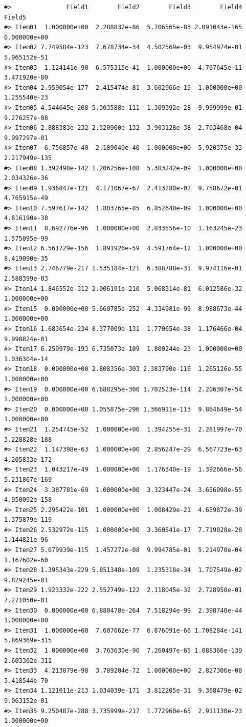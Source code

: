 \begin{verbatim}
#>               Field1        Field2        Field3        Field4        Field5
#> Item01  1.000000e+00  2.288832e-86  5.706565e-83 2.091043e-165  0.000000e+00
#> Item02 7.749584e-123  7.678734e-34  4.502569e-03  9.954974e-01  5.965152e-51
#> Item03  1.124141e-90  6.575315e-41  1.000000e+00  4.767645e-11  3.471920e-80
#> Item04 2.959054e-177  2.415474e-81  3.602966e-19  1.000000e+00  1.255540e-23
#> Item05 4.544645e-208 5.303588e-111  1.309392e-28  9.999999e-01  9.276257e-08
#> Item06 2.888383e-232 2.320900e-132  3.903128e-38  2.703468e-04  9.997297e-01
#> Item07  6.756857e-40  2.189049e-40  1.000000e+00  5.920375e-33 2.217949e-135
#> Item08 1.392498e-142 1.206256e-108  5.383242e-09  1.000000e+00  2.034326e-36
#> Item09 1.936847e-121  4.171067e-67  2.413280e-02  9.758672e-01  4.765915e-49
#> Item10 7.597617e-142  1.803765e-85  6.852640e-09  1.000000e+00  4.816190e-38
#> Item11  8.692776e-96  1.000000e+00  2.833556e-10  1.163245e-23  1.575095e-99
#> Item12 6.561729e-156  1.891926e-59  4.591764e-12  1.000000e+00  8.419090e-35
#> Item13 2.746779e-217 1.535184e-121  6.388788e-31  9.974116e-01  2.588399e-03
#> Item14 1.846552e-312 2.006191e-210  5.068314e-81  6.012586e-32  1.000000e+00
#> Item15  0.000000e+00 5.660785e-252  4.334981e-99  8.988673e-44  1.000000e+00
#> Item16 1.683654e-234 8.377009e-131  1.770654e-38  1.176466e-04  9.998824e-01
#> Item17 6.259979e-193 6.735073e-109  1.800244e-23  1.000000e+00  1.036304e-14
#> Item18  0.000000e+00 2.808356e-303 2.383790e-116  1.265126e-55  1.000000e+00
#> Item19  0.000000e+00 6.688295e-300 1.702523e-114  2.206307e-54  1.000000e+00
#> Item20  0.000000e+00 1.055875e-296 1.366911e-113  9.864649e-54  1.000000e+00
#> Item21  1.254745e-52  1.000000e+00  1.394255e-31  2.281997e-70 3.228828e-188
#> Item22  1.147398e-63  1.000000e+00  2.856247e-29  6.567723e-63 4.205833e-172
#> Item23  1.043217e-49  1.000000e+00  1.176340e-19  1.392666e-56 5.231867e-169
#> Item24  3.387781e-69  1.000000e+00  3.323447e-24  3.656098e-55 4.950092e-158
#> Item25 2.295422e-101  1.000000e+00  1.008429e-21  4.659872e-39 1.375879e-119
#> Item26 2.532972e-115  1.000000e+00  3.360541e-17  7.719020e-28  1.144821e-96
#> Item27 5.079939e-115  1.457272e-08  9.994785e-01  5.214970e-04  1.167602e-60
#> Item28 1.395343e-229 5.851348e-109  1.235318e-34  1.707549e-02  9.829245e-01
#> Item29 1.923332e-222 2.552749e-122  2.118045e-32  2.728950e-01  7.271050e-01
#> Item30  0.000000e+00 6.880478e-264  7.518294e-99  2.398740e-44  1.000000e+00
#> Item31  1.000000e+00  7.607062e-77  6.876091e-66 1.708284e-141 5.869369e-315
#> Item32  1.000000e+00  3.763630e-90  7.260497e-65 1.088366e-139 2.603302e-311
#> Item33  4.213879e-98  3.789204e-72  1.000000e+00  2.827306e-08  3.418544e-70
#> Item34 1.121011e-213 1.034039e-171  3.812205e-31  9.368479e-02  9.063152e-01
#> Item35 9.250487e-280 3.735999e-217  1.772960e-65  2.911130e-23  1.000000e+00
\end{verbatim}

